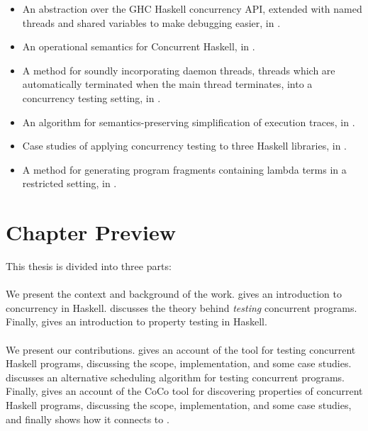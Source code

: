 \begin{itemize}
\item An abstraction over the GHC Haskell concurrency API, extended
  with named threads and shared variables to make debugging easier, in
  .
\item An operational semantics for Concurrent Haskell, in
  .
\item A method for soundly incorporating daemon threads, threads which
  are automatically terminated when the main thread terminates, into a
  concurrency testing setting, in .
\item An algorithm for semantics-preserving simplification of
  execution traces, in .
\item Case studies of applying concurrency testing to three Haskell
  libraries, in .
\item A method for generating program fragments containing lambda
  terms in a restricted setting, in .
\end{itemize}

\section{Chapter Preview}
\label{sec:intro-roadmap}

This thesis is divided into three parts:

\paragraph{}
We present the context and background of the work.
 gives an introduction to concurrency in
Haskell.   discusses the theory behind \emph{testing}
concurrent programs.  Finally,  gives an
introduction to property testing in Haskell.

\paragraph{}
We present our contributions.   gives an account of
the \dejafu{} tool for testing concurrent Haskell programs, discussing
the scope, implementation, and some case studies.
 discusses an alternative scheduling algorithm
for testing concurrent programs.  Finally,  gives an
account of the CoCo tool for discovering properties of concurrent
Haskell programs, discussing the scope, implementation, and some case
studies, and finally shows how it connects to \dejafu{}.

